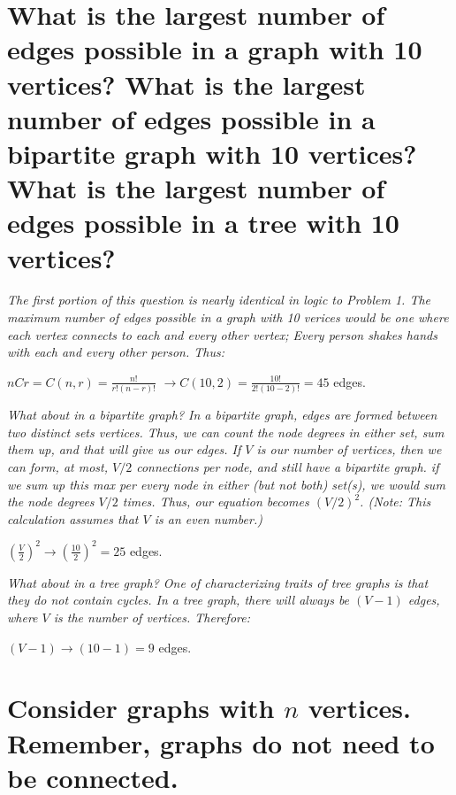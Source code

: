 \documentclass{article}
\begin{document}

\section{What is the largest number of edges possible in a graph with 10 vertices?
    What is the largest number of edges possible in a bipartite graph with 10 vertices?
    What is the largest number of edges possible in a tree with 10 vertices?}
\hspace{1cm}\textit{The first portion of this question is nearly identical in logic to 
    Problem 1. The maximum number of edges possible in a graph with 10 verices would be
    one where each vertex connects to each and every other vertex; Every person shakes
    hands with each and every other person. Thus:}
\begin{center}
    \large{$nCr = C(n,r) = \frac{n!}{r!(n-r)!}$}
    \large{$\xrightarrow{} C(10,2) = \frac{10!}{2!(10-2)!}
        = 45$ edges.} \\
\end{center}
\hspace{1cm}\textit{What about in a bipartite graph? In a bipartite graph, edges are formed
    between two distinct sets vertices. Thus, we can count the node degrees in either
    set, sum them up, and that will give us our edges. If $V$ is our number of vertices, then
    we can form, at most, $V/2$ connections per node, and still have a bipartite graph.
    if we sum up this max per every node in either (but not both) set(s), we would sum the node
    degrees $V/2$ times. Thus, our equation becomes $(V/2)^2$. (Note: This calculation assumes
    that $V$ is an even number.)}
\begin{center}
    \large{$(\frac{V}{2})^2 \xrightarrow{} (\frac{10}{2})^2 = 25$ edges.} \\
\end{center}
\hspace{1cm}\textit{What about in a tree graph? One of characterizing traits of tree graphs is that 
they do not contain cycles. In a tree graph, there will always be $(V-1)$ edges, where $V$ is
the number of vertices. Therefore:}
\begin{center}
    \large{$(V-1) \xrightarrow{} (10-1) = 9$ edges.} \\
\end{center}
\clearpage


\section{Consider graphs with $n$ vertices. Remember, graphs do not need to be connected.}
\end{document}
